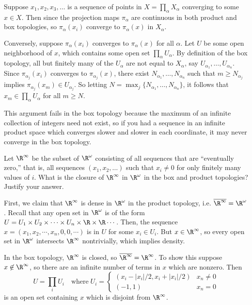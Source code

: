 \documentclass[11pt,letterpaper]{article}
\begin{document}
\begin{solution}
    Suppose $x_1,x_2,x_3,\ldots$ is a sequence of points in $X=\prod_\alpha X_\alpha$ converging to some $x\in X$. Then since the projection maps $\pi_\alpha$ are continuous in both product and box topologies, so $\pi_\alpha(x_i)$ converge to $\pi_\alpha(x)$ in $X_\alpha$.
    
    Conversely, suppose $\pi_\alpha(x_i)$ converges to $\pi_\alpha(x)$ for all $\alpha$. Let $U$ be some open neighborhood of $x$, which contains some open set $\prod_\alpha U_\alpha$. By definition of the box topology, all but finitely many of the $U_\alpha$ are not equal to $X_\alpha$, say $U_{\alpha_1}, \ldots, U_{\alpha_n}$. Since $\pi_{\alpha_j}(x_i)$ converges to $\pi_{\alpha_j}(x)$, there exist $N_{\alpha_1},\ldots,N_{\alpha_n}$ such that $m\geq N_{\alpha_j}$ implies $\pi_{\alpha_j}(x_m) \in U_{\alpha_j}$. So letting $N=\max_j \{N_{\alpha_1},\ldots,N_{\alpha_n}\}$, it follows that $x_m\in \prod_\alpha U_\alpha$ for all $m\geq N$.     
    
    This argument fails in the box topology because the maximum of an infinite collection of integers need not exist, so if you had a sequence in an infinite product space which converges slower and slower in each coordinate, it may never converge in the box topology.
\end{solution}

\begin{problem}
    Let $\R^\infty$ be the subset of $\R^\omega$ consisting of all sequences that are ``eventually zero,'' that is, all sequences $(x_1,x_2,\ldots)$ such that $x_i\neq 0$ for only finitely many values of $i$. What is the closure of $\R^\infty$ in $\R^\omega$ in the box and product topologies? Justify your answer.    
\end{problem}

\begin{solution}
    First, we claim that $\R^\infty$ is dense in $\R^\omega$ in the product topology, i.e. $\overline{\R^\infty}=\R^\omega$ . Recall that any open set in $\R^\omega$ is of the form $U=U_1\times U_2\times \cdots\times U_n\times \R \times\R \cdots$. Then, the sequence $x=(x_1,x_2,\cdots,x_n,0,0,\cdots)$ is in $U$ for some $x_i\in U_i$. But $x\in \R^\infty$, so every open set in $\R^\omega$ intersects $\R^\infty$ nontrivially, which implies density.

    In the box topology, $\R^\infty$ is closed, so $\overline{\R^\infty}=\R^\infty$. To show this suppose $x\not\in \R^\infty$, so there are an infinite number of terms in $x$ which are nonzero. Then
    \[
        U=\prod_i U_i\quad\textrm{where}\; U_i=\begin{cases}(x_i-|x_i| /2, x_i+|x_i| /2)&x_n\neq 0\\ (-1, 1)&x_n=0\end{cases}
    \]
    is an open set containing $x$ which is disjoint from $\R^\infty$. 
    
\end{solution}
\end{document}
